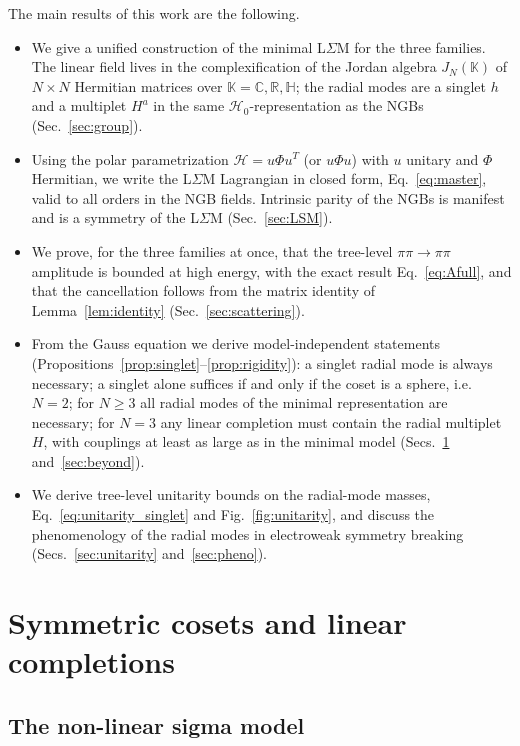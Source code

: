 \documentclass[aps,prd,twocolumn,superscriptaddress,nofootinbib,floatfix]{revtex4-2}
\theoremstyle{remark}
\newcommand{\Hf}{\mathcal{H}}      %
\newcommand{\Hg}{\mathcal{H}_0}    %
\newcommand{\ie}{i.e.}
\begin{document}
The main results of this work are the following.
\begin{itemize}
\item[(1)] We give a unified construction of the minimal L$\Sigma$M for the three families. The linear field lives in the complexification of the Jordan algebra $J_N(\mathbb{K})$ of $N\times N$ Hermitian matrices over $\mathbb{K}=\mathbb{C},\mathbb{R},\mathbb{H}$; the radial modes are a singlet $h$ and a multiplet $H^a$ in the same $\Hg$-representation as the NGBs (Sec.~\ref{sec:group}).
\item[(2)] Using the polar parametrization $\Hf=u\Phi u^T$ (or $u\Phi u$) with $u$ unitary and $\Phi$ Hermitian, we write the L$\Sigma$M Lagrangian in closed form, Eq.~\eqref{eq:master}, valid to all orders in the NGB fields. Intrinsic parity of the NGBs is manifest and is a symmetry of the L$\Sigma$M (Sec.~\ref{sec:LSM}).
\item[(3)] We prove, for the three families at once, that the tree-level $\pi\pi\to\pi\pi$ amplitude is bounded at high energy, with the exact result Eq.~\eqref{eq:Afull}, and that the cancellation follows from the matrix identity of Lemma~\ref{lem:identity} (Sec.~\ref{sec:scattering}).
\item[(4)] From the Gauss equation we derive model-independent statements (Propositions~\ref{prop:singlet}--\ref{prop:rigidity}): a singlet radial mode is always necessary; a singlet alone suffices if and only if the coset is a sphere, \ie\ $N=2$; for $N\ge 3$ all radial modes of the minimal representation are necessary; for $N=3$ any linear completion must contain the radial multiplet $H$, with couplings at least as large as in the minimal model (Secs.~\ref{sec:geometry} and~\ref{sec:beyond}).
\item[(5)] We derive tree-level unitarity bounds on the radial-mode masses, Eq.~\eqref{eq:unitarity_singlet} and Fig.~\ref{fig:unitarity}, and discuss the phenomenology of the radial modes in electroweak symmetry breaking (Secs.~\ref{sec:unitarity} and~\ref{sec:pheno}).
\end{itemize}

\section{Symmetric cosets and linear completions}
\label{sec:geometry}

\subsection{The non-linear sigma model}
\end{document}
